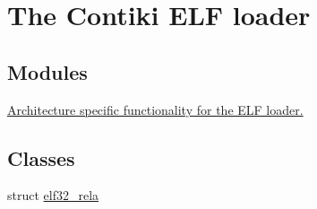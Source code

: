 \hypertarget{group__elfloader}{}\section{The Contiki E\+L\+F loader}
\label{group__elfloader}
\subsection*{Modules}
\begin{DoxyCompactItemize}
\item 
\hyperlink{group__elfloaderarch}{Architecture specific functionality for the E\+L\+F loader.}
\end{DoxyCompactItemize}
\subsection*{Classes}
\begin{DoxyCompactItemize}
\item 
struct \hyperlink{structelf32__rela}{elf32\+\_\+rela}
\end{DoxyCompactItemize}
